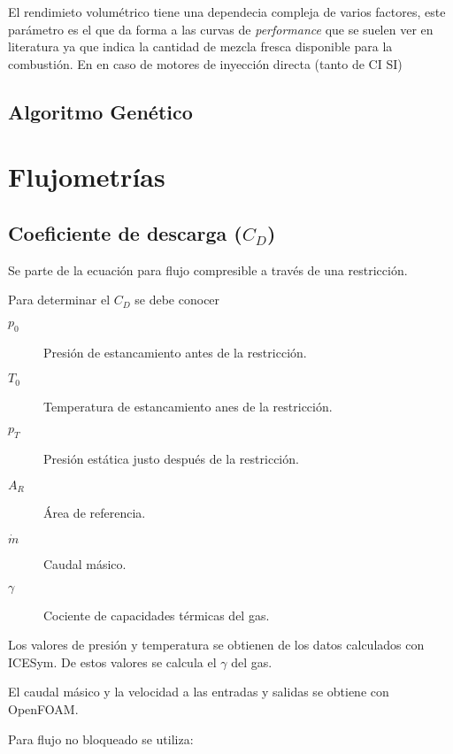 El rendimieto volumétrico tiene una dependecia compleja de varios factores,
este parámetro es el que da forma a las curvas de \emph{performance} que se
suelen ver en literatura ya que indica la cantidad de mezcla fresca disponible
para la combustión. En en caso de motores de inyección directa (tanto de CI SI)

\subsection{Algoritmo Genético}

\section{Flujometrías}
\subsection{}
\subsection{Coeficiente de descarga ($C_D$)}

Se parte de la ecuación para flujo compresible a través de una restricción.

Para determinar el $C_D$ se debe conocer

\begin{description}
    \item[$p_0$] Presión de estancamiento antes de la restricción.
    \item[$T_0$] Temperatura de estancamiento anes de la restricción.
    \item[$p_T$] Presión estática justo después de la restricción.
    \item[$A_R$] Área de referencia.
    \item[$\dot{m}$] Caudal másico.
    \item[$\gamma$] Cociente de capacidades térmicas del gas.
\end{description}

Los valores de presión y temperatura se obtienen de los datos calculados con
ICESym. De estos valores se calcula el $\gamma$ del gas.

El caudal másico y la velocidad a las entradas y salidas se obtiene con
OpenFOAM.

Para flujo no bloqueado se utiliza:

